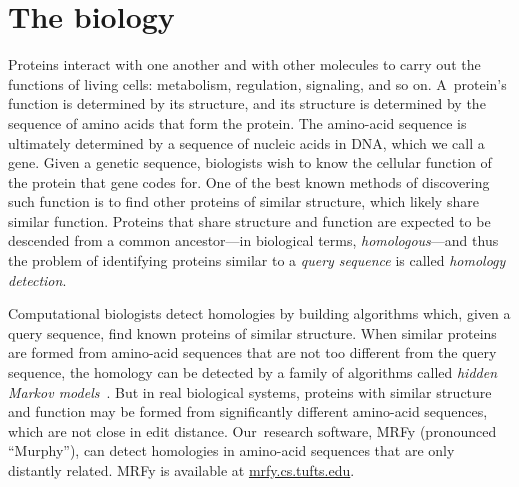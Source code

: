 \documentclass[preprint,nonatbib,blockstyle,times]{sigplanconf}
\newcommand\secref[1]{Section~\ref{sec:#1}}
\let\cite\citep
\begin{document}
\section{The biology}

Proteins %
interact with one another and with other 
molecules to carry out the functions of living cells: metabolism, regulation, 
signaling, and so on.
A~protein's function is determined by its structure, 
and its structure is determined by the sequence of amino acids that
form the protein.
The amino-acid sequence is ultimately determined by a sequence of
nucleic acids in DNA, which we call a gene.
Given a genetic sequence, biologists wish to know the cellular
function of the protein that gene codes for.
One of the best known methods of discovering such function is
to find other proteins of 
similar structure, which likely share similar function.
Proteins that share structure and function are expected to be
descended from a common ancestor---in biological terms, \emph{homologous}---and
thus
the problem of identifying proteins similar to a \textit{query sequence} is called 
\textit{homology detection}.




Computational biologists detect homologies by building 
algorithms which, given a {query sequence}, %
find known proteins of similar structure.
When similar proteins are formed from amino-acid sequences that
are not too different from the query sequence, the homology can be
detected by
a family of algorithms called 
\textit{hidden Markov models}~\cite{Eddy:1998ut}.
But in real biological systems,
proteins with similar structure and function may be formed from significantly 
different amino-acid sequences, which are not close in edit distance.
Our~research software, MRFy (pronounced
``Murphy''), can detect homologies 
in amino-acid sequences that are only distantly related.
MRFy is available at \url{mrfy.cs.tufts.edu}.
%
%

%
%
%
\end{document}

